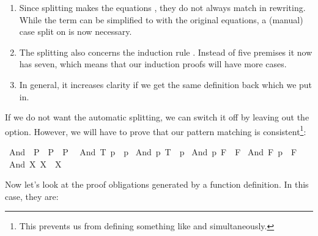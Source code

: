 \begin{isabellebody}
\begin{isamarkuptext}
\begin{enumerate}
  \item Since splitting makes the equations , they
  do not always match in rewriting. While the term 
  can be simplified to  with the original equations, a
  (manual) case split on  is now necessary.

  \item The splitting also concerns the induction rule . Instead of five premises it now has seven, which
  means that our induction proofs will have more cases.

  \item In general, it increases clarity if we get the same definition
  back which we put in.
  \end{enumerate}

  If we do not want the automatic splitting, we can switch it off by
  leaving out the  option. However, we will have to
  prove that our pattern matching is consistent\footnote{This prevents
  us from defining something like  and  simultaneously.}:%
\end{isamarkuptext}%
\isamarkuptrue%
\isamarkupfalse%
\ And{}\ {\isacharcolon}{\isacharcolon}\ {\isachardoublequoteopen}P{}\ {\isasymRightarrow}\ P{}\ {\isasymRightarrow}\ P{}{\isachardoublequoteclose}\isanewline
{}\isanewline
\ \ {\isachardoublequoteopen}And{}\ T\ p\ {\isacharequal}\ p{\isachardoublequoteclose}\isanewline
{\isacharbar}\ {\isachardoublequoteopen}And{}\ p\ T\ {\isacharequal}\ p{\isachardoublequoteclose}\isanewline
{\isacharbar}\ {\isachardoublequoteopen}And{}\ p\ F\ {\isacharequal}\ F{\isachardoublequoteclose}\isanewline
{\isacharbar}\ {\isachardoublequoteopen}And{}\ F\ p\ {\isacharequal}\ F{\isachardoublequoteclose}\isanewline
{\isacharbar}\ {\isachardoublequoteopen}And{}\ X\ X\ {\isacharequal}\ X{\isachardoublequoteclose}%
\isadelimproof
%
\endisadelimproof
%
\isatagproof
%
\begin{isamarkuptxt}%
\noindent Now let's look at the proof obligations generated by a
  function definition. In this case, they are:


\end{isamarkuptxt}
\end{isabellebody}
